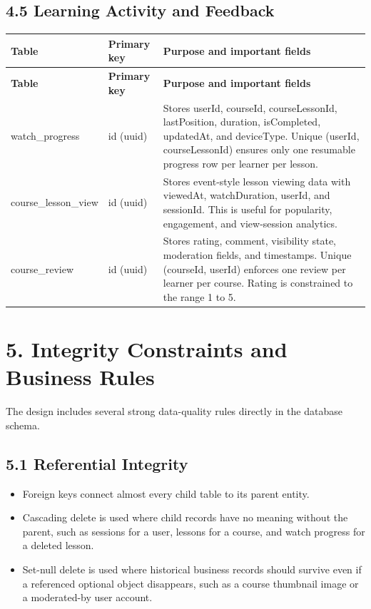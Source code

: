 \documentclass[11pt,a4paper]{article}
\begin{document}
\subsection*{4.5 Learning Activity and Feedback}
\begin{longtable}{L{2.6cm}L{3.0cm}L{9.0cm}}
\toprule
\textbf{Table} & \textbf{Primary key} & \textbf{Purpose and important fields} \\
\midrule
\endfirsthead
\toprule
\textbf{Table} & \textbf{Primary key} & \textbf{Purpose and important fields} \\
\midrule
\endhead
\bottomrule
\endfoot
watch\_progress & id (uuid) & Stores userId, courseId, courseLessonId, lastPosition, duration, isCompleted, updatedAt, and deviceType. Unique (userId, courseLessonId) ensures only one resumable progress row per learner per lesson. \\
course\_lesson\_view & id (uuid) & Stores event-style lesson viewing data with viewedAt, watchDuration, userId, and sessionId. This is useful for popularity, engagement, and view-session analytics. \\
course\_review & id (uuid) & Stores rating, comment, visibility state, moderation fields, and timestamps. Unique (courseId, userId) enforces one review per learner per course. Rating is constrained to the range 1 to 5. \\
\end{longtable}

\section*{5. Integrity Constraints and Business Rules}
The design includes several strong data-quality rules directly in the database schema.

\subsection*{5.1 Referential Integrity}
\begin{itemize}[leftmargin=1.5em]
	\item Foreign keys connect almost every child table to its parent entity.
	\item Cascading delete is used where child records have no meaning without the parent, such as sessions for a user, lessons for a course, and watch progress for a deleted lesson.
	\item Set-null delete is used where historical business records should survive even if a referenced optional object disappears, such as a course thumbnail image or a moderated-by user account.
\end{itemize}
\end{document}
